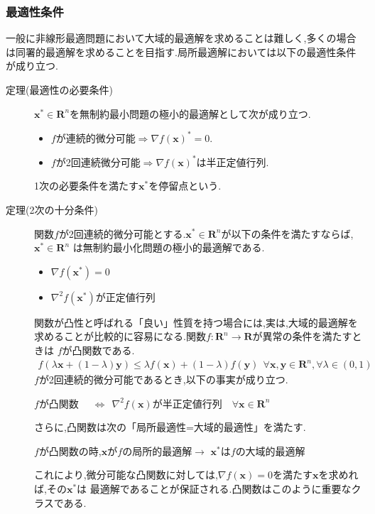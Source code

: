 \documentclass[12pt]{jarticle}
\begin{document}
\subsubsection{最適性条件}
一般に非線形最適問題において大域的最適解を求めることは難しく,多くの場合は同署的最適解を求めることを目指す.局所最適解においては以下の最適性条件が成り立つ.
\begin{description}
    \item[定理(最適性の必要条件)] $\boldsymbol{x}^*\in \boldsymbol{R}^n$を無制約最小問題の極小的最適解として次が成り立つ.
          \begin{itemize}
              \item $f$が連続的微分可能$\Rightarrow \nabla f(\boldsymbol{x})^*=0$.
              \item $f$が2回連続微分可能$\Rightarrow \nabla f(\boldsymbol{x})^*$は半正定値行列.
          \end{itemize}
          1次の必要条件を満たす$\boldsymbol{x}^*$を停留点という.
    \item[定理(2次の十分条件)] 関数$f$が2回連続的微分可能とする.$\boldsymbol{x}^*\in \boldsymbol{R}^n$が以下の条件を満たすならば,$\boldsymbol{x}^*\in \boldsymbol{R}^n$
          は無制約最小化問題の極小的最適解である.
          \begin{itemize}
              \item $\nabla f(\boldsymbol{x}^*)=0$
              \item $\nabla^2f(\boldsymbol{x}^*)$が正定値行列
          \end{itemize}
          関数が凸性と呼ばれる「良い」性質を持つ場合には,実は,大域的最適解を求めることが比較的に容易になる.関数$f:\boldsymbol{R}^n\rightarrow \boldsymbol{R}$が異常の条件を満たすときは
          $f$が凸関数である.
          \begin{eqnarray}
              f(\lambda\boldsymbol{x}+(1-\lambda)\boldsymbol{y})\leq \lambda f(\boldsymbol{x})+(1-\lambda)f(\boldsymbol{y})\ \ \forall \boldsymbol{x},\boldsymbol{y}\in \boldsymbol{R}^n,\forall \lambda\in(0,1)\nonumber
          \end{eqnarray}
          $f$が2回連続的微分可能であるとき,以下の事実が成り立つ.
          \begin{center}
              $f$が凸関数 \ \ $\Leftrightarrow\ \ \nabla^2f(\boldsymbol{x})$が半正定値行列\ \ $\forall \boldsymbol{x}\in \boldsymbol{R}^n$
          \end{center}
          さらに,凸関数は次の「局所最適性=大域的最適性」を満たす.
          \begin{center}
              $f$が凸関数の時,$\boldsymbol{x}$が$f$の局所的最適解$\rightarrow$ $\boldsymbol{x}^*$は$f$の大域的最適解
          \end{center}
          これにより,微分可能な凸関数に対しては,$\nabla f(\boldsymbol{x})=0$を満たす$\boldsymbol{x}$を求めれば,その$\boldsymbol{x}^*$は
          最適解であることが保証される.凸関数はこのように重要なクラスである.
\end{description}
\end{document}
